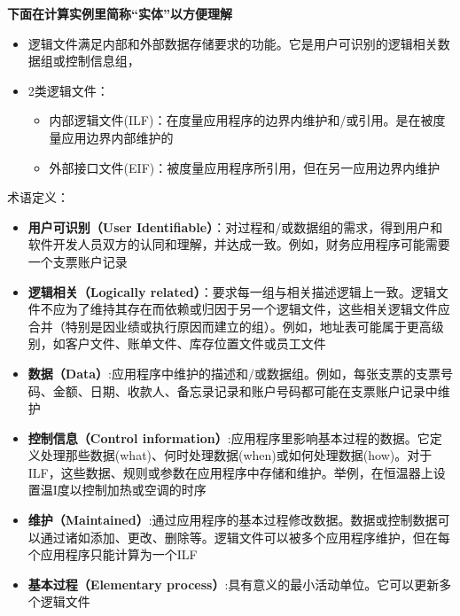 \textbf{下面在计算实例里简称``实体''以方便理解}

\begin{itemize}
\tightlist
\item
  逻辑文件满足内部和外部数据存储要求的功能。它是用户可识别的逻辑相关数据组或控制信息组，
\item
  2类逻辑文件：

  \begin{itemize}
  \tightlist
  \item
    内部逻辑文件(ILF)：在度量应用程序的边界内维护和/或引用。是在被度量应用边界内部维护的
  \item
    外部接口文件(EIF)：被度量应用程序所引用，但在另一应用边界内维护
  \end{itemize}
\end{itemize}

术语定义：

\begin{itemize}
\tightlist
\item
  \textbf{用户可识别（User
  Identifiable）}：对过程和/或数据组的需求，得到用户和软件开发人员双方的认同和理解，并达成一致。例如，财务应用程序可能需要一个支票账户记录\\
\item
  \textbf{逻辑相关（Logically
  related）}：要求每一组与相关描述逻辑上一致。逻辑文件不应为了维持其存在而依赖或归因于另一个逻辑文件，这些相关逻辑文件应合并（特别是因业绩或执行原因而建立的组）。例如，地址表可能属于更高级别，如客户文件、账单文件、库存位置文件或员工文件\\
\item
  \textbf{数据（Data）}:应用程序中维护的描述和/或数据组。例如，每张支票的支票号码、金额、日期、收款人、备忘录记录和账户号码都可能在支票账户记录中维护\\
\item
  \textbf{控制信息（Control
  information）}:应用程序里影响基本过程的数据。它定义处理那些数据(what)、何时处理数据(when)或如何处理数据(how)。对于ILF，这些数据、规则或参数在应用程序中存储和维护。举例，在恒温器上设置温I度以控制加热或空调的时序\\
\item
  \textbf{维护（Maintained）}:通过应用程序的基本过程修改数据。数据或控制数据可以通过诸如添加、更改、删除等。逻辑文件可以被多个应用程序维护，但在每个应用程序只能计算为一个ILF\\
\item
  \textbf{基本过程（Elementary
  process）}:具有意义的最小活动单位。它可以更新多个逻辑文件\\
\end{itemize}


